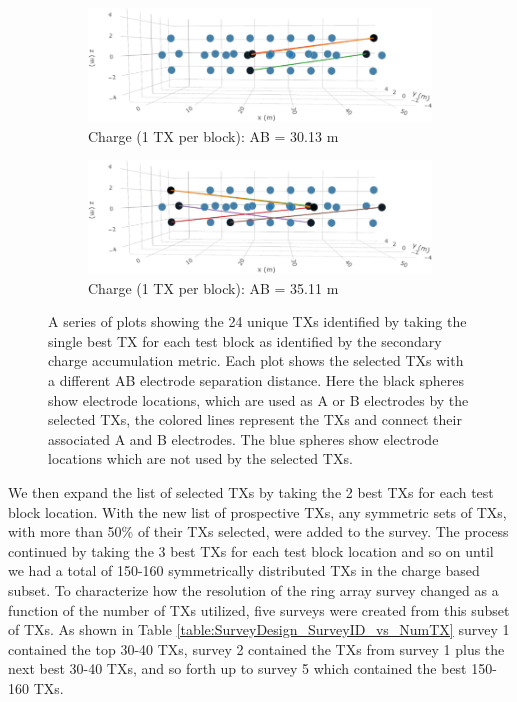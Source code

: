 \documentclass[preprint,authoryear,12pt]{elsarticle}
\begin{document}
\begin{figure} [htp]
\begin{center}
      \begin{subfigure}{0.6\linewidth}
         \includegraphics[trim=0cm 0cm 0cm 0cm, clip=true, width=\linewidth]{./figures/Fig19d.png}
         \caption{Charge (1 TX per block): AB = 30.13 m}
         \label{fig:SurveyDesign_Charge_1TxPerBlk_AB_30o13m}
      \end{subfigure}

      \begin{subfigure}{0.6\linewidth}
         \includegraphics[trim=0cm 0cm 0cm 0cm, clip=true, width=\linewidth]{./figures/Fig19e.png}
         \caption{Charge (1 TX per block): AB = 35.11 m}
         \label{fig:SurveyDesign_Charge_1TxPerBlk_AB_35o11m}
      \end{subfigure}

    \end{center}
    \vspace{-0.5cm}
\caption{A series of plots showing the 24 unique TXs identified by taking the single best TX for each test block as identified by the secondary charge accumulation metric. Each plot shows the selected TXs with a different AB electrode separation distance. Here the black spheres show electrode locations, which are used as A or B electrodes by the selected TXs, the colored lines represent the TXs and connect their associated A and B electrodes. The blue spheres show electrode locations which are not used by the selected TXs.}
\label{fig:SurveyDesign_Charge_1TXPerBlk}
\end{figure}


We then expand the list of selected TXs by taking the 2 best TXs for each test block location. With the new list of prospective TXs, any symmetric sets of TXs, with more than 50\% of their TXs selected, were added to the survey. The process continued by taking the 3 best TXs for each test block location and so on until we had a total of 150-160 symmetrically distributed TXs in the charge based subset. To characterize how the resolution of the ring array survey changed as a function of the number of TXs utilized, five surveys were created from this subset of TXs. As shown in Table \ref{table:SurveyDesign_SurveyID_vs_NumTX} survey 1 contained the top 30-40 TXs, survey 2 contained the TXs from survey 1 plus the next best 30-40 TXs, and so forth up to survey 5 which contained the best 150-160 TXs.
\end{document}
